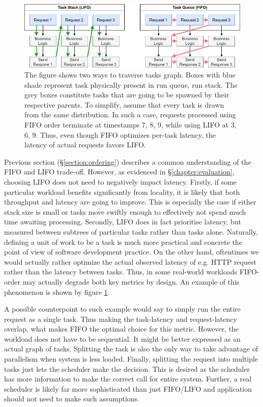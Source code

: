 \documentclass[12pt,a4paper,twoside]{report}
\begin{document}
\begin{figure}
    \centering
    \includegraphics[width=1\textwidth]{FIFOLIFO.png}
    \caption{The figure shows two ways to traverse tasks graph. Boxes with blue shade represent task physically present in run queue, run stack. The grey boxes constitute tasks that are going to be spawned by their respective parents. To simplify, assume that every task is drawn from the same distribution. In such a case, requests processed using FIFO order terminate at timestamps 7, 8, 9, while using LIFO at 3, 6, 9. Thus, even though FIFO optimizes per-task latency, the latency of actual requests favors LIFO.}
   \label{fig:fifo-lifo-latency}
\end{figure}

Previous section (\S\ref{section:ordering}) describes a common understanding of the FIFO and LIFO trade-off. However,  as evidenced in \S\ref{chapter:evaluation}, choosing LIFO does not need to negatively impact latency. Firstly, if some particular workload benefits significantly from locality, it is likely that both throughput and latency are going to improve. This is especially the case if either stack size is small or tasks move swiftly enough to effectively not spend much time awaiting processing. Secondly, LIFO does in fact prioritise latency, but measured between subtrees of particular tasks rather than tasks alone. Naturally, defining a unit of work to be a task is much more practical and concrete the point of view of software development practice. On the other hand, oftentimes we would actually rather optimize the actual observed latency of e.g. HTTP request rather than the latency between tasks. Thus, in some real-world workloads FIFO-order may actually degrade both key metrics by design. An example of this phenomenon is shown by figure \ref{fig:fifo-lifo-latency}. 

A possible counterpoint to such example would say to simply run the entire request as a single task. Thus making the task-latency and request-latency overlap, what makes FIFO the optimal choice for this metric. However, the workload does not have to be sequential. It might be better expressed as an actual graph of tasks. Splitting the task is also the only way to take advantage of parallelism when system is less loaded. Finally, splitting the request into multiple tasks just lets the scheduler make the decision. This is desired as the scheduler has more information to make the correct call for entire system. Further, a real scheduler is likely far more sophisticated than just FIFO/LIFO and application should not need to make such assumptions. 
\end{document}
